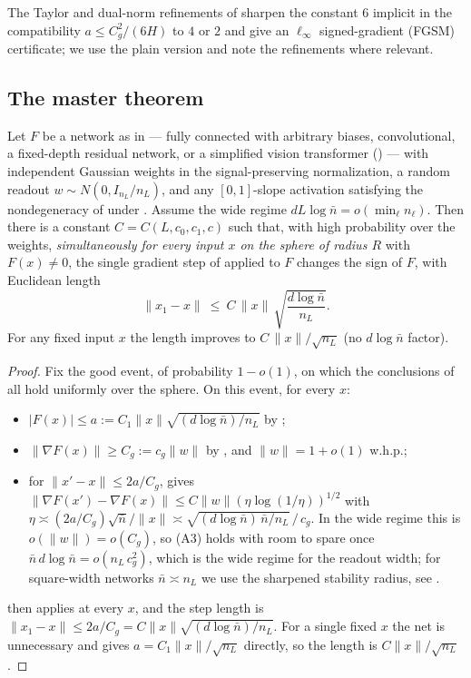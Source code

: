The Taylor and dual-norm refinements of \cite{advExt} sharpen the constant $6$ implicit in the
compatibility $a\le C_g^2/(6H)$ to $4$ or $2$ and give an $\ell_\infty$ signed-gradient
(FGSM) certificate; we use the plain version and note the refinements where relevant.

\subsection{The master theorem}
\begin{theorem}\label{thm:master}
Let $F$ be a network as in  --- fully connected with arbitrary biases,
convolutional, a fixed-depth residual network, or a simplified vision transformer () ---
with independent Gaussian weights in the signal-preserving normalization, a random readout
$w\sim N(0,I_{n_L}/n_L)$, and any $[0,1]$-slope activation satisfying the nondegeneracy of
 under . Assume the wide regime $dL\log\bar n=o(\min_\ell n_\ell)$.
Then there is a constant $C=C(L,c_0,c_1,c)$ such that, with high probability over the weights,
\emph{simultaneously for every input $x$ on the sphere of radius $R$} with $F(x)\ne0$, the single
gradient step of  applied to $F$ changes the sign of $F$, with Euclidean length
\[
  \|x_1-x\|\ \le\ C\,\|x\|\,\sqrt{\frac{d\log\bar n}{n_L}}.
\]
For any fixed input $x$ the length improves to $C\,\|x\|/\sqrt{n_L}$ (no $d\log\bar n$ factor).
\end{theorem}

\begin{proof}
Fix the good event, of probability $1-o(1)$, on which the conclusions of 
all hold uniformly over the sphere. On this event, for every $x$:
\begin{itemize}
\item[(A1)] $|F(x)|\le a:=C_1\|x\|\sqrt{(d\log\bar n)/n_L}$ by ;
\item[(A2)] $\|\nabla F(x)\|\ge C_g:=c_g\|w\|$ by , and $\|w\|=1+o(1)$ w.h.p.;
\item[(A3)] for $\|x'-x\|\le 2a/C_g$,  gives
$\|\nabla F(x')-\nabla F(x)\|\le C\|w\|(\eta\log(1/\eta))^{1/2}$ with
$\eta\asymp(2a/C_g)\sqrt{\bar n}/\|x\|\asymp\sqrt{(d\log\bar n)\,\bar n/n_L}\,/\,c_g$. In the wide
regime this is $o(\|w\|)=o(C_g)$, so (A3) holds with room to spare once $\bar n\,d\log\bar n=o(n_L\,c_g^{2})$,
which is the wide regime for the readout width; for square-width networks $\bar n\asymp n_L$ we use the
sharpened stability radius, see .
\end{itemize}
 then applies at every $x$, and the step length is $\|x_1-x\|\le 2a/C_g=
C\|x\|\sqrt{(d\log\bar n)/n_L}$. For a single fixed $x$ the net is unnecessary and 
gives $a=C_1\|x\|/\sqrt{n_L}$ directly, so the length is $C\|x\|/\sqrt{n_L}$.
\end{proof}

